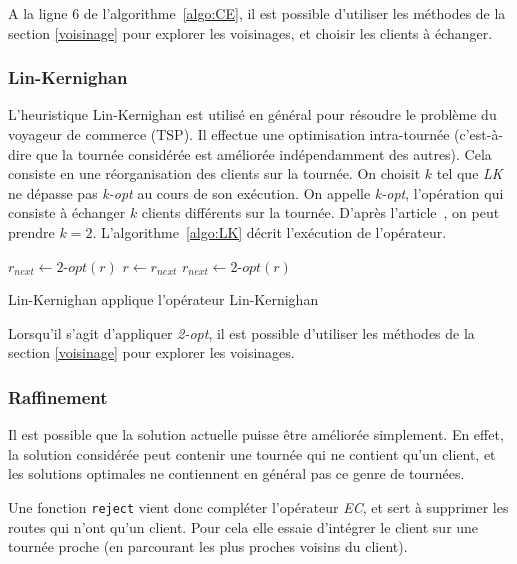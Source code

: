 \documentclass[a4paper,11pt]{article}%
\begin{document}
A la ligne $6$ de l'algorithme~\ref{algo:CE}, il est possible d'utiliser les méthodes de la section \ref{voisinage} pour explorer les voisinages, et choisir les clients à échanger.

\subsubsection{Lin-Kernighan}

L'heuristique Lin-Kernighan est utilisé en général pour résoudre le problème du voyageur de commerce (TSP). Il effectue une optimisation intra-tournée (c'est-à-dire que la tournée considérée est améliorée indépendamment des autres). Cela consiste en une réorganisation des clients sur la tournée. On choisit $k$ tel que \emph{LK} ne dépasse pas \emph{k-opt} au cours de son exécution. On appelle \emph{k-opt}, l'opération qui consiste à échanger $k$ clients différents sur la tournée. D'après l'article~\cite{Sorensen_2017}, on peut prendre $k = 2$.
L'algorithme~\ref{algo:LK} décrit l'exécution de l'opérateur.

\begin{algorithm}
\DontPrintSemicolon %
$r_{next} \gets 2$-$opt(r) $\;
 {
  $r \gets r_{next}$\;
  $r_{next} \gets 2$-$opt(r)$\;
}
\;
\caption{{\sc Lin-Kernighan} applique l'opérateur Lin-Kernighan}
\label{algo:LK}
\end{algorithm}

Lorsqu'il s'agit d'appliquer \emph{2-opt}, il est possible d'utiliser les méthodes de la section \ref{voisinage} pour explorer les voisinages.

\subsubsection{Raffinement}

Il est possible que la solution actuelle puisse être améliorée simplement. En effet, la solution considérée peut contenir une tournée qui ne contient qu'un client, et les solutions optimales ne contiennent en général pas ce genre de tournées.  

Une fonction \lstinline|reject| vient donc compléter l'opérateur \emph{EC}, et sert à supprimer les routes qui n'ont qu'un client. Pour cela elle essaie d'intégrer le client sur une tournée proche (en parcourant les plus proches voisins du client).
\end{document}
